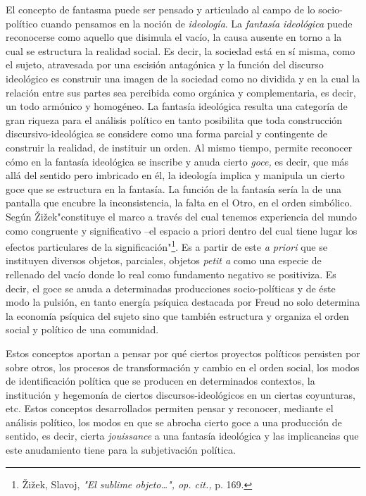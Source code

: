 El concepto de fantasma puede ser pensado y articulado al campo de lo
socio-político cuando pensamos en la noción de \emph{ideología}. La
\emph{fantasía ideológica} puede reconocerse como aquello que disimula
el vacío, la causa ausente en torno a la cual se estructura la realidad
social. Es decir, la sociedad está en sí misma, como el sujeto,
atravesada por una escisión antagónica y la función del discurso
ideológico es construir una imagen de la sociedad como no dividida y en
la cual la relación entre sus partes sea percibida como orgánica y
complementaria, es decir, un todo armónico y homogéneo. La fantasía
ideológica resulta una categoría de gran riqueza para el análisis
político en tanto posibilita que toda construcción discursivo-ideológica
se considere como una forma parcial y contingente de construir la
realidad, de instituir un orden. Al mismo tiempo, permite reconocer cómo
en la fantasía ideológica se inscribe y anuda cierto \emph{goce,} es
decir, que más allá del sentido pero imbricado en él, la ideología
implica y manipula un cierto goce que se estructura en la fantasía. La
función de la fantasía sería la de una pantalla que encubre la
inconsistencia, la falta en el Otro, en el orden simbólico. Según
Žižek"constituye el marco a través del cual tenemos experiencia del
mundo como congruente y significativo --el espacio a priori dentro del
cual tiene lugar los efectos particulares de la
significación"\footnote{Žižek, Slavoj, \emph{"El sublime objeto\ldots",
  op. cit.,} p. 169.}. Es a partir de este \emph{a priori} que se
instituyen diversos objetos, parciales, objetos \emph{petit a} como una
especie de rellenado del vacío donde lo real como fundamento negativo se
positiviza. Es decir, el goce se anuda a determinadas producciones
socio-políticas y de éste modo la pulsión, en tanto energía psíquica
destacada por Freud no solo determina la economía psíquica del sujeto
sino que también estructura y organiza el orden social y político de una
comunidad.

Estos conceptos aportan a pensar por qué ciertos proyectos políticos
persisten por sobre otros, los procesos de transformación y cambio en el
orden social, los modos de identificación política que se producen en
determinados contextos, la institución y hegemonía de ciertos
discursos-ideológicos en un ciertas coyunturas, etc. Estos conceptos
desarrollados permiten pensar y reconocer, mediante el análisis
político, los modos en que se abrocha cierto goce a una producción de
sentido, es decir, cierta \emph{jouissance} a una fantasía ideológica y
las implicancias que este anudamiento tiene para la subjetivación
política.

